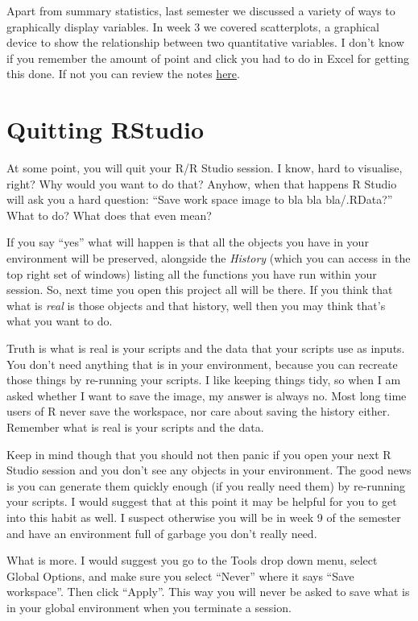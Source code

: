 \documentclass[
]{book}
\begin{document}
Apart from summary statistics, last semester we discussed a variety of ways to graphically display variables. In week 3 we covered scatterplots, a graphical device to show the relationship between two quantitative variables. I don't know if you remember the amount of point and click you had to do in Excel for getting this done. If not you can review the notes \href{https://rawgit.com/maczokni/MSCD/master/Lesson_3.html\#visualising-the-differences-between-groups}{here}.

\hypertarget{quitting-rstudio}{%
\section{Quitting RStudio}\label{quitting-rstudio}}

At some point, you will quit your R/R Studio session. I know, hard to visualise, right? Why would you want to do that? Anyhow, when that happens R Studio will ask you a hard question: ``Save work space image to bla bla bla/.RData?'' What to do? What does that even mean?

If you say ``yes'' what will happen is that all the objects you have in your environment will be preserved, alongside the \emph{History} (which you can access in the top right set of windows) listing all the functions you have run within your session. So, next time you open this project all will be there. If you think that what is \emph{real} is those objects and that history, well then you may think that's what you want to do.

Truth is what is real is your scripts and the data that your scripts use as inputs. You don't need anything that is in your environment, because you can recreate those things by re-running your scripts. I like keeping things tidy, so when I am asked whether I want to save the image, my answer is always no. Most long time users of R never save the workspace, nor care about saving the history either. Remember what is real is your scripts and the data.

Keep in mind though that you should not then panic if you open your next R Studio session and you don't see any objects in your environment. The good news is you can generate them quickly enough (if you really need them) by re-running your scripts. I would suggest that at this point it may be helpful for you to get into this habit as well. I suspect otherwise you will be in week 9 of the semester and have an environment full of garbage you don't really need.

What is more. I would suggest you go to the Tools drop down menu, select Global Options, and make sure you select ``Never'' where it says ``Save workspace''. Then click ``Apply''. This way you will never be asked to save what is in your global environment when you terminate a session.
\end{document}
